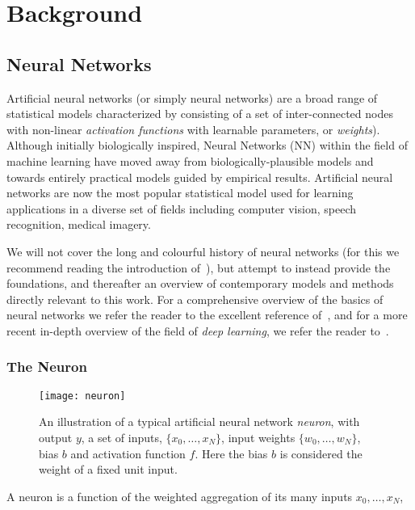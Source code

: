 \documentclass[thesis]{subfiles}
\begin{document}


\chapter{Background}
\label{background}

\section{Neural Networks}
Artificial neural networks (or simply neural networks) are a broad range of statistical models characterized by consisting of a set of inter-connected nodes with non-linear \emph{activation functions} with learnable parameters, or \emph{weights}).
 Although initially biologically inspired, Neural Networks (NN) within the field of machine learning have moved away from biologically-plausible models and towards entirely practical models guided by empirical results. Artificial neural networks are now the most popular statistical model used for learning applications in a diverse set of fields including computer vision, speech recognition, medical imagery. 

We will not cover the long and colourful history of neural networks (for this we recommend reading the introduction of~\citet{goodfellow2016deep}), but attempt to instead provide the foundations, and thereafter an overview of contemporary models and methods directly relevant to this work. For a comprehensive overview of the basics of neural networks we refer the reader to the excellent reference of~\citet{Bishop1995}, and for a more recent  in-depth overview of the field of \emph{deep learning}, we refer the reader to~\citet{goodfellow2016deep}. 

\subsection{The Neuron}

\begin{figure}[tbp]
\centering
\texttt{[image: neuron]}
\caption[An illustration of a typical artificial neural network neuron]{An illustration of a typical artificial neural network \emph{neuron}, with output $y$, a set of inputs, $\{x_0, \ldots, x_N\}$, input weights $\{w_0, \ldots, w_N\}$, bias $b$ and activation function $f$. Here the bias $b$ is considered the weight of a fixed unit input.}
\label{fig:neuron}
\end{figure}
A neuron is a function of the weighted aggregation of its many inputs ${x_0,\ldots,x_N}$,
\end{document}
